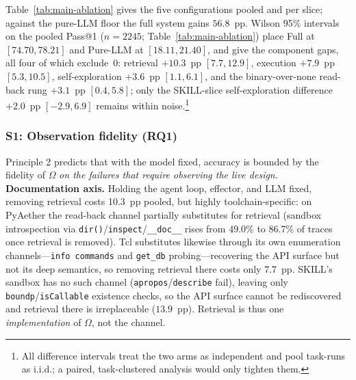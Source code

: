 Table~\ref{tab:main-ablation} gives the five configurations pooled and per slice; against the pure-LLM floor the full system gains $56.8$~pp. Wilson 95\% intervals on the pooled Pass@1 ($n{=}2245$; Table~\ref{tab:main-ablation}) place Full at $[74.70,78.21]$ and Pure-LLM at $[18.11,21.40]$, and give the component gaps, all four of which exclude~0: retrieval $+10.3$~pp $[7.7,12.9]$, execution $+7.9$~pp $[5.3,10.5]$, self-exploration $+3.6$~pp $[1.1,6.1]$, and the binary-over-none read-back rung $+3.1$~pp $[0.4,5.8]$; only the SKILL-slice self-exploration difference $+2.0$~pp $[-2.9,6.9]$ remains within noise.\footnote{All difference intervals treat the two arms as independent and pool task-runs as i.i.d.; a paired, task-clustered analysis would only tighten them.}

\subsubsection{S1: Observation fidelity (RQ1)}
\label{sec:omega-fidelity}

Principle 2 predicts that with the model fixed, accuracy is bounded by the fidelity of $\Omega$ \emph{on the failures that require observing the live design}. \textbf{Documentation axis.} Holding the agent loop, effector, and LLM fixed, removing retrieval costs 10.3~pp pooled, but highly toolchain-specific: on PyAether the read-back channel partially substitutes for retrieval (sandbox introspection via \texttt{dir()}/\texttt{inspect}/\texttt{\_\_doc\_\_} rises from 49.0\% to 86.7\% of traces once retrieval is removed). Tcl substitutes likewise through its own enumeration channels---\texttt{info commands} and \texttt{get\_db} probing---recovering the API surface but not its deep semantics, so removing retrieval there costs only $7.7$~pp. SKILL's sandbox has no such channel (\texttt{apropos}/\texttt{describe} fail), leaving only \texttt{boundp}/\texttt{isCallable} existence checks, so the API surface cannot be rediscovered and retrieval there is irreplaceable ($13.9$~pp). Retrieval is thus one \emph{implementation} of $\Omega$, not the channel.

